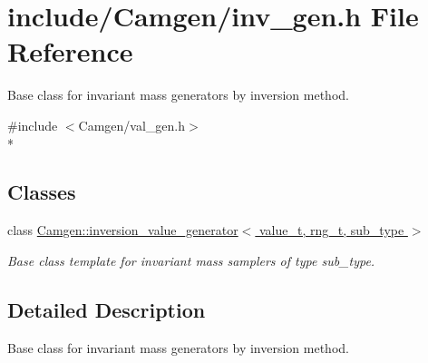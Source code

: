 \hypertarget{a00672}{}\section{include/\+Camgen/inv\+\_\+gen.h File Reference}
\label{a00672}


Base class for invariant mass generators by inversion method.  


{\ttfamily \#include $<$Camgen/val\+\_\+gen.\+h$>$}\\*
\subsection*{Classes}
\begin{DoxyCompactItemize}
\item 
class \hyperlink{a00321}{Camgen\+::inversion\+\_\+value\+\_\+generator$<$ value\+\_\+t, rng\+\_\+t, sub\+\_\+type $>$}
\begin{DoxyCompactList}\small\item\em Base class template for invariant mass samplers of type sub\+\_\+type. \end{DoxyCompactList}\end{DoxyCompactItemize}


\subsection{Detailed Description}
Base class for invariant mass generators by inversion method. 

